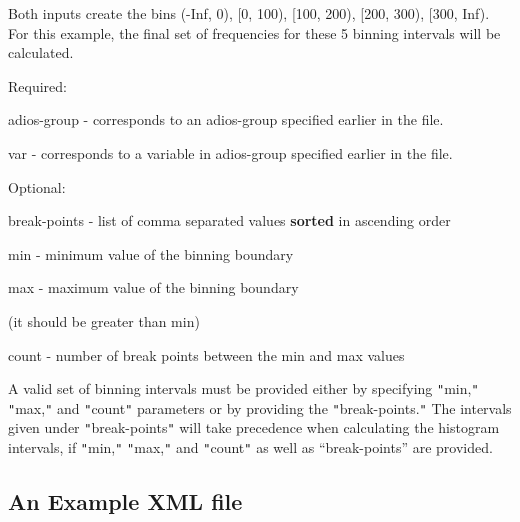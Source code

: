 \vspace{10pt}
\leftskip=0pt
\parindent=0pt
Both inputs create the bins (-Inf, 0), [0, 100), [100, 200), [200, 300), [300, 
Inf). For this example, the final set of frequencies for these 5 binning intervals 
will be calculated.

\vspace{10pt}
Required:

\vspace{10pt}
\leftskip=76pt
\parindent=-54pt
adios-group - corresponds to an adios-group specified earlier in the file.

\vspace{10pt}
var - corresponds to a variable in adios-group specified earlier in the file.

\vspace{10pt}
\leftskip=0pt
\parindent=0pt
Optional:

\vspace{10pt}
\leftskip=36pt
\parindent=-18pt
break-points - list of comma separated values \textbf{sorted} in ascending order

\vspace{10pt}
\parindent=-3pt
min  - minimum value of the binning boundary

\vspace{10pt}
\parindent=-18pt
max - maximum value of the binning boundary 

\vspace{10pt}
(it should be greater than min)

\vspace{10pt}
count - number of break points between the min and max values 

\vspace{10pt}
\leftskip=0pt
\parindent=0pt
A valid set of binning intervals must be provided either by specifying \texttt{"}min,\texttt{"} 
\texttt{"}max,\texttt{"} and \texttt{"}count\texttt{"} parameters or by providing 
the \texttt{"}break-points.\texttt{"} The intervals given under \texttt{"}break-points\texttt{"} 
will take precedence when calculating the histogram intervals, if \texttt{"}min,\texttt{"} 
\texttt{"}max,\texttt{"} and \texttt{"}count\texttt{"} as well as ``break-points'' 
are provided.\pagebreak{}\label{HToc182553378}

\vspace{10pt}
\subsection*{{\large \textbf{An Example XML file}}}


